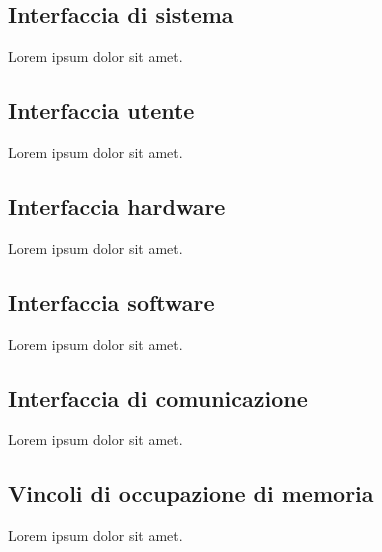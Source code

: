 \documentclass{scrreprt}
\begin{document}

	\subsection{Interfaccia di sistema}
	Lorem ipsum dolor sit amet.


	\subsection{Interfaccia utente}
	Lorem ipsum dolor sit amet.


	\subsection{Interfaccia hardware}
	Lorem ipsum dolor sit amet.


	\subsection{Interfaccia software}
	Lorem ipsum dolor sit amet.


	\subsection{Interfaccia di comunicazione}
	Lorem ipsum dolor sit amet.


	\subsection{Vincoli di occupazione di memoria}
	Lorem ipsum dolor sit amet.
\end{document}
